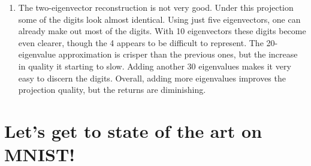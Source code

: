 \documentclass{article}
\begin{document}
\begin{enumerate}
    \begin{figure}
    	\centering
        \begin{subfigure}[b]{0.95\textwidth}
        	\centering
        	\texttt{[image: 10evRecon]}
        	\caption{Reconstruction with 10 eigenvectors}
        	\label{fig:10ev}
        \end{subfigure}
        \begin{subfigure}[b]{0.95\textwidth}
        	\centering
        	\texttt{[image: 20evRecon]}
        	\caption{Reconstruction with 20 eigenvectors}
        	\label{fig:20ev}
        \end{subfigure}
        \begin{subfigure}[b]{0.95\textwidth}
        	\centering
        	\texttt{[image: 50evRecon]}
        	\caption{Reconstruction with 50 eigenvectors}
        	\label{fig:50ev}
        \end{subfigure}
        \caption{Reconstructions of MNIST images using different numbers of eigenvectors} 
        \label{fig:evRecons2}
    \end{figure}
    Figure \ref{fig:evRecons1} shows the reconstructions produced using two and five eigenvectors, respectively. Figure \ref{fig:evRecons2} visualizes the reconstructions utilizing 10, 20, and 50 eigenvectors, respectively.
    \item The two-eigenvector reconstruction is not very good. Under this projection some of the digits look almost identical. Using just five eigenvectors, one can already make out most of the digits. With 10 eigenvectors these digits become even clearer, though the 4 appears to be difficult to represent. The 20-eigenvalue approximation is crisper than the previous ones, but the increase in quality it starting to slow. Adding another 30 eigenvalues makes it very easy to discern the digits. Overall, adding more eigenvalues improves the projection quality, but the returns are diminishing.
\end{enumerate}


\section{Let's get to state of the art on MNIST!}
\end{document}
